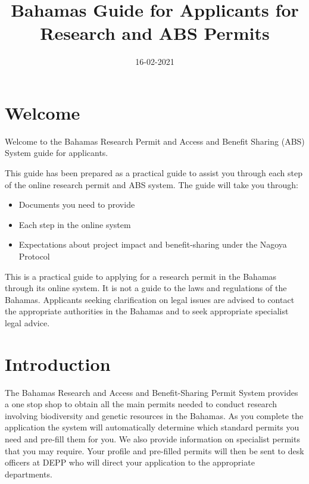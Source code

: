 \documentclass[
]{book}
\title{Bahamas Guide for Applicants for Research and ABS Permits}
\author{}
\date{\vspace{-2.5em}16-02-2021}
\providecommand{\tightlist}{%
  \setlength{\itemsep}{0pt}\setlength{\parskip}{0pt}}
\begin{document}
\maketitle

{
\setcounter{tocdepth}{1}
\tableofcontents
}
\hypertarget{welcome}{%
\chapter*{Welcome}\label{welcome}}

Welcome to the Bahamas Research Permit and Access and Benefit Sharing (ABS) System guide for applicants.

This guide has been prepared as a practical guide to assist you through each step of the online research permit and ABS system. The guide will take you through:

\begin{itemize}
\tightlist
\item
  Documents you need to provide
\item
  Each step in the online system
\item
  Expectations about project impact and benefit-sharing under the Nagoya Protocol
\end{itemize}

This is a practical guide to applying for a research permit in the Bahamas through its online system. It is not a guide to the laws and regulations of the Bahamas. Applicants seeking clarification on legal issues are advised to contact the appropriate authorities in the Bahamas and to seek appropriate specialist legal advice.

\hypertarget{introduction}{%
\chapter*{Introduction}\label{introduction}}

The Bahamas Research and Access and Benefit-Sharing Permit System provides a one stop shop to obtain all the main permits needed to conduct research involving biodiversity and genetic resources in the Bahamas. As you complete the application the system will automatically determine which standard permits you need and pre-fill them for you. We also provide information on specialist permits that you may require. Your profile and pre-filled permits will then be sent to desk officers at DEPP who will direct your application to the appropriate departments.
\end{document}
